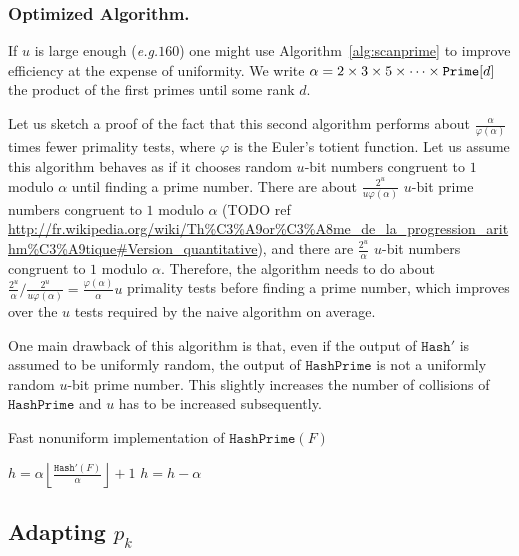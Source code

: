 \documentclass[11pt]{llncs}
\newcommand{\eg}{\textit{e.g.}\xspace}
\newcommand{\Hash}{\ensuremath{\mathtt{Hash}}}
\newcommand{\HashPrime}{\ensuremath{\mathtt{HashPrime}}}
\begin{document}
\subsubsection{Optimized Algorithm.}
If $u$ is large enough (\eg $160$) one might %
use Algorithm~\ref{alg:scanprime} to improve efficiency at the expense of uniformity. We write $\alpha=2\times 3\times 5\times \cdots \times \mbox{{\tt Prime}}[d]$ the product of the first primes until some rank $d$.

Let us sketch a proof of the fact that this second algorithm performs about $\frac{\alpha}{\varphi(\alpha)}$ times fewer primality tests, where $\varphi$ is the Euler's totient function.
Let us assume this algorithm behaves as if it chooses random $u$-bit numbers congruent to $1$ modulo $\alpha$ until finding a prime number.
There are about $\frac{2^u}{u \varphi(\alpha)}$ $u$-bit prime numbers congruent to $1$ modulo $\alpha$ (TODO ref \url{http://fr.wikipedia.org/wiki/Th%C3%A9or%C3%A8me_de_la_progression_arithm%C3%A9tique#Version_quantitative}), and there are $\frac{2^u}{\alpha}$ $u$-bit numbers congruent to $1$ modulo $\alpha$.
Therefore, the algorithm needs to do about $\frac{2^u}{\alpha} / \frac{2^u}{u \varphi(\alpha)} = \frac{\varphi(\alpha)}{\alpha} u$ primality tests before finding a prime number, which improves over the $u$ tests required by the naive algorithm on average.

One main drawback of this algorithm is that, even if the output of $\Hash'$ is assumed to be uniformly random, the output of $\HashPrime$ is not a uniformly random $u$-bit prime number.
This slightly increases the number of collisions of $\HashPrime$ and $u$ has to be increased subsequently.

\begin{algorithm}[t]
  \caption{Fast nonuniform implementation of $\HashPrime(F)$}
  \label{alg:scanprime}
  \begin{algorithmic}[1]
  \State $h =\alpha \left\lfloor\frac{\Hash'(F)}{\alpha}\right\rfloor+1$
\State $h = h-\alpha$
\EndWhile
\State {}
  \end{algorithmic}
\end{algorithm}

\subsection{Adapting $p_k$}
\label{sec:choicep}
\end{document}
